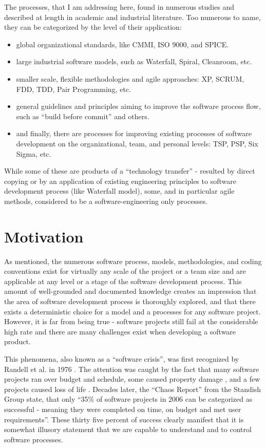 The processes, that I am addressing here, found in numerous studies and described at length in 
academic and industrial literature. Too numerous to name, they can be categorized by the level 
of their application:
\begin{itemize}
 \item global organizational standards, like CMMI, ISO 9000, and SPICE. 
 \item large industrial software models, such as Waterfall, Spiral, Cleanroom, etc.
 \item smaller scale, flexible methodologies and agile approaches: XP, SCRUM, FDD, 
TDD, Pair Programming, etc.
 \item general guidelines and principles aiming to improve the software process flow, 
such as ``build before commit'' and others.
 \item and finally, there are processes for improving existing processes of software development 
on the organizational, team, and personal levels: TSP, PSP, Six Sigma, etc.
\end{itemize}
While some of these are products of a ``technology transfer'' - resulted by direct copying or by an 
application of existing engineering principles to software development process (like Waterfall model), 
some, and in particular agile methods, considered to be a software-engineering only processes. 

\section{Motivation}
As mentioned, the numerous software process, models, methodologies, and coding conventions 
exist for virtually any scale of the project or a team size and are applicable at any 
level or a stage of the software development process. This amount of well-grounded and 
documented knowledge creates an impression that the area of software development 
process is thoroughly explored, and that there exists a deterministic choice for a model and a 
processes for any software project. However, it is far from being true - software projects still fail 
at the considerable high rate and there are many challenges exist when developing a software product.

This phenomena, also known as a ``software crisis'', was first recognized by Randell et al. in 1976 
\cite{naur1976software}. The attention was caught by the fact that many software projects ran 
over budget and schedule, some caused property damage \cite{citeulike:11044022}, and a few projects caused 
loss of life \cite{citeulike:712058}. Decades later, the ``Chaos Report'' from the Standish 
Group \cite{SDTimes} state, that only ``35\% of software projects in 2006 can 
be categorized as successful - meaning they were completed on time, on budget and met 
user requirements''. These thirty five percent of success clearly manifest that it is somewhat 
illusory statement that we are capable to understand and to control software processes.

